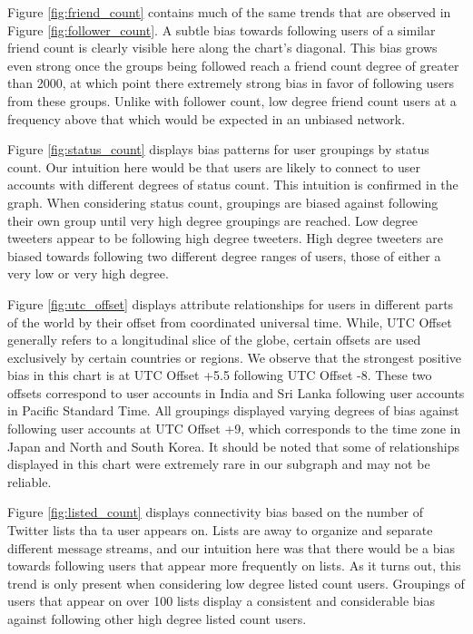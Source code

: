 Figure \ref{fig:friend_count} contains much of the same trends that are observed in Figure \ref{fig:follower_count}.  A subtle bias towards following users of a similar friend count is clearly visible here along the chart's diagonal.  This bias grows even strong once the groups being followed reach a friend count degree of greater than 2000, at which point there extremely strong bias in favor of following users from these groups.  Unlike with follower count, low degree friend count users at a frequency above that which would be expected in an unbiased network.

Figure \ref{fig:status_count} displays bias patterns for user groupings by status count.  Our intuition here would be that users are likely to connect to user accounts with different degrees of status count.  This intuition is confirmed in the graph.  When considering status count, groupings are biased against following their own group until very high degree groupings are reached.  Low degree tweeters appear to be following high degree tweeters.  High degree tweeters are biased towards following two different degree ranges of users, those of either a very low or very high degree.

Figure \ref{fig:utc_offset} displays attribute relationships for users in different parts of the world by their offset from coordinated universal time.  While, UTC Offset generally refers to a longitudinal slice of the globe, certain offsets are used exclusively by certain countries or regions.  We observe that the strongest positive bias in this chart is at UTC Offset +5.5 following UTC Offset -8.  These two offsets correspond to user accounts in India and Sri Lanka following user accounts in Pacific Standard Time.  All groupings displayed varying degrees of bias against following user accounts at UTC Offset +9, which corresponds to the time zone in Japan and North and South Korea.  It should be noted that some of relationships displayed in this chart were extremely rare in our subgraph and may not be reliable.
 
Figure \ref{fig:listed_count} displays connectivity bias based on the number of Twitter lists tha ta user appears on.  Lists are away to organize and separate different message streams, and our intuition here was that there would be a bias towards following users that appear more frequently on lists.  As it turns out, this trend is only present when considering low degree listed count users.  Groupings of users that appear on over 100 lists display a consistent and considerable bias against following other high degree listed count users.

